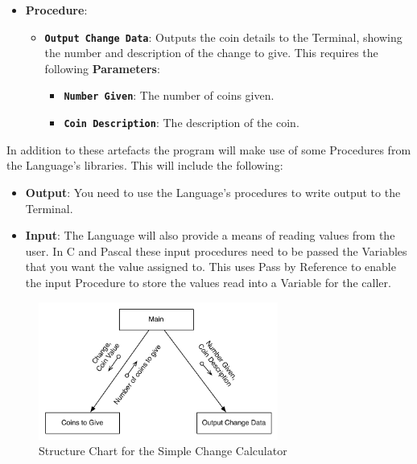 \begin{itemize}
\begin{itemize}
\begin{itemize}
    \end{itemize}
  \end{itemize}
  \item \textbf{Procedure}:
  \begin{itemize}
    \item \texttt{\textbf{Output Change Data}}: Outputs the coin details to the Terminal, showing the number and description of the change to give. This requires the following \textbf{Parameters}:
    \begin{itemize}
      \item \textbf{\texttt{Number Given}}: The number of coins given.
      \item \textbf{\texttt{Coin Description}}: The description of the coin.
    \end{itemize}
  \end{itemize}
\end{itemize}

In addition to these artefacts the program will make use of some Procedures from the Language's libraries. This will include the following:
\begin{itemize}
  \item \textbf{Output}: You need to use the Language's procedures to write output to the Terminal.
  \item \textbf{Input}: The Language will also provide a means of reading values from the user. In C and Pascal these input procedures need to be passed the Variables that you want the value assigned to. This uses Pass by Reference to enable the input Procedure to store the values read into a Variable for the caller.
\end{itemize}



\begin{figure}[p]
   \centering
   \includegraphics[width=0.7\textwidth]{./topics/storing-using-data/images/SimpleCalcStructure} 
   \caption{Structure Chart for the Simple Change Calculator}
   \label{fig:simple-change-structure}
\end{figure}

